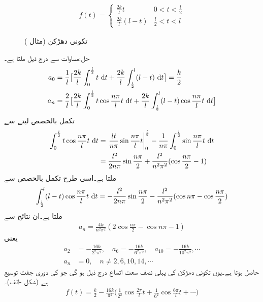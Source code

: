 \begin{align*}
f(t)=
\begin{cases}
\frac{2k}{l}t&0<t<\frac{l}{2}\\
\frac{2k}{l}(l-t)&\frac{l}{2}<t<l
\end{cases}
\end{align*}
%
\begin{figure}
\centering
{}
\caption{تکونی دھڑکن (مثال )}
\label{شکل_مثال_فوریئر_تکونی_دھڑکن}
\end{figure}

حل:مساوات  سے درج ذیل ملتا ہے۔
\begin{align*}
a_0&=\frac{1}{l}\big[\frac{2k}{l}\int_0^{\frac{l}{2}}t\,\dif t+\frac{2k}{l}\int_{\frac{l}{2}}^{l}(l-t)\,\dif t\big]=\frac{k}{2}\\
a_n&=\frac{2}{l}\big[\frac{2k}{l}\int_0^{\frac{l}{2}}t\cos \frac{n\pi}{l}t\,\dif t+\frac{2k}{l}\int_{\frac{l}{2}}^{l}(l-t)\cos \frac{n\pi}{l}t\,\dif t\big]
\end{align*}
تکمل بالحصص لیتے  سے
\begin{align*}
\int_0^{\frac{l}{2}}t\cos \frac{n\pi}{l}t\,\dif t&=\left. \frac{lt}{n\pi}\sin \frac{n\pi}{l}t\right|_0^{\frac{l}{2}}-\frac{1}{n\pi}\int_0^{\frac{l}{2}} \sin \frac{n\pi}{l}t\,\dif t\\
&=\frac{l^2}{2n\pi}\sin \frac{n\pi}{2}+\frac{l^2}{n^2\pi^2}(\cos \frac{n\pi}{2}-1)
\end{align*}
ملتا ہے۔اسی طرح تکمل بالحصص سے
\begin{align*}
\int_{\frac{l}{2}}^{l}(l-t)\cos \frac{n\pi}{l}t\,\dif t=-\frac{l^2}{2n\pi}\sin\frac{n\pi}{2}-\frac{l^2}{n^2\pi^2}(\cos n\pi-\cos \frac{n\pi}{2})
\end{align*}
ملتا ہے۔ان نتائج سے
\begin{align*}
a_n=\frac{4k}{n^2\pi^2}(2\cos \frac{n\pi}{2}-\cos n\pi-1)
\end{align*}
یعنی
\begin{align*}
a_2&=-\frac{16k}{2^2\pi^2},\quad a_6=-\frac{16k}{6^2\pi^2},\quad a_{10}=-\frac{16k}{10^2\pi^2},\cdots\\
a_n&=0,\quad n\ne 2,6,10,14,\cdots
\end{align*}
حاصل ہوتا ہے۔یوں تکونی دھڑکن   کی پہلی نصف سعت اتساع درج ذیل ہو گی جو  کی دوری جفت توسیع ہے (شکل -الف)۔ 
\begin{align*}
f(t)=\frac{k}{2}-\frac{16k}{\pi^2}\big(\frac{1}{2^2}\cos \frac{2\pi}{l}t+\frac{1}{6^2}\cos \frac{6\pi}{l}t+\cdots\big)
\end{align*} 

